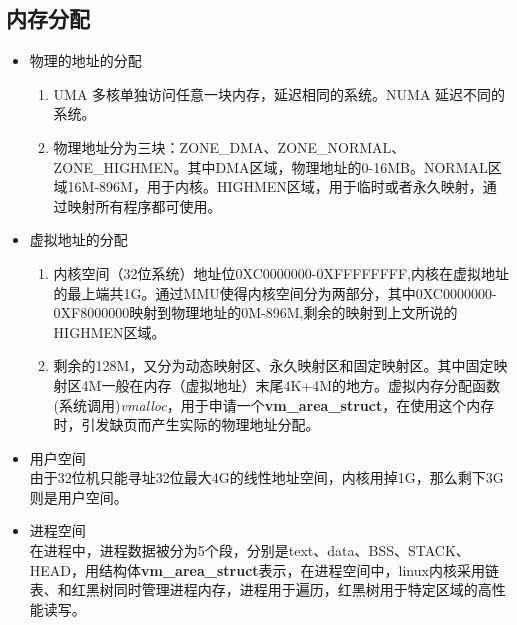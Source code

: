     \subsection{内存分配}
    	\begin{itemize}
    		\item 物理的地址的分配 \\
    			\begin{enumerate}
    				\item UMA 多核单独访问任意一块内存，延迟相同的系统。NUMA 延迟不同的系统。
    				\item 物理地址分为三块：ZONE\_DMA、ZONE\_NORMAL、ZONE\_HIGHMEN。其中DMA区域，物理地址的0-16MB。NORMAL区域16M-896M，用于内核。HIGHMEN区域，用于临时或者永久映射，通过映射所有程序都可使用。
    			\end{enumerate}
    		\item 虚拟地址的分配
    			\begin{enumerate}
					\item 内核空间（32位系统）地址位0XC0000000-0XFFFFFFFF,内核在虚拟地址的最上端共1G。通过MMU使得内核空间分为两部分，其中0XC0000000-0XF8000000映射到物理地址的0M-896M,剩余的映射到上文所说的HIGHMEN区域。
					\item 剩余的128M，又分为动态映射区、永久映射区和固定映射区。其中固定映射区4M一般在内存（虚拟地址）末尾4K+4M的地方。虚拟内存分配函数(系统调用)\emph{vmalloc}，用于申请一个\textbf{vm\_area\_struct}，在使用这个内存时，引发缺页而产生实际的物理地址分配。
					
				\end{enumerate}   
			\item 用户空间\\
				由于32位机只能寻址32位最大4G的线性地址空间，内核用掉1G，那么剩下3G则是用户空间。 	
			\item 进程空间\\
				在进程中，进程数据被分为5个段，分别是text、data、BSS、STACK、HEAD，用结构体\textbf{vm\_area\_struct}表示，在进程空间中，linux内核采用链表、和红黑树同时管理进程内存，进程用于遍历，红黑树用于特定区域的高性能读写。
    	\end{itemize}
